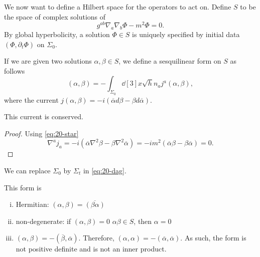 
We now want to define a Hilbert space for the operators to act on.
Define $S$ to be the space of complex solutions of 
\begin{equation}
  \label{eq:20-star}
  g^{ab} \nabla_{a} \nabla_{b} \Phi - m^2 \Phi = 0.
\end{equation}
By global hyperbolicity, a solution $\Phi \in S$ is uniquely specified by initial data $(\Phi, \partial_{t} \Phi)$ on $\Sigma_0$.
\begin{definition}[]
  If we are given two solutions $\alpha, \beta \in S$, we define a sesquilinear form on $S$ as follows
  \begin{equation}
    \label{eq:20-dag}
    (\alpha, \beta) = - \int_{\Sigma_0} \dd[3]{x} \sqrt{h} n_a j^{a} (\alpha, \beta),
  \end{equation}
  where the current $j(\alpha, \beta) = -i (\overline{\alpha}{} d \beta - \beta d \overline{\alpha}{})$.
\end{definition}
\begin{claim}
  This current is conserved.
\end{claim}
\begin{proof}
  Using \eqref{eq:20-star}
  \begin{equation}
    \nabla^{a} j_{a} = -i (\overline{\alpha}{} \nabla^2 \beta - \beta \nabla^2 \overline{\alpha}{}) = -i m^2 (\overline{\alpha}{} \beta - \beta \overline{\alpha}{}) = 0.
  \end{equation}
\end{proof}
\begin{corollary}
  We can replace $\Sigma_0$ by $\Sigma_t$ in \eqref{eq:20-dag}.
\end{corollary} 
\begin{remark}
  This form is
  \begin{enumerate}[(i)]
    \item Hermitian: $(\alpha, \beta) = \overline{(\beta \alpha)}{}$
    \item non-degenerate: if $(\alpha, \beta) = 0$ $\alpha \beta \in S$, then $\alpha = 0$
    \item $(\alpha, \beta) = -(\overline{\beta}{}, \overline{\alpha}{})$. Therefore, $(\alpha, \alpha) = - (\overline{\alpha}{}, \overline{\alpha}{})$. As such, the form is not positive definite and is not an inner product.
  \end{enumerate}
\end{remark}

